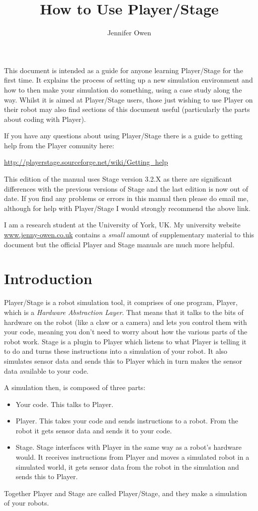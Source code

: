\documentclass[a4paper]{report}
\title{How to Use Player/Stage}
\author{Jennifer Owen}
\newcommand{\plst}{Player/Stage\xspace}
\newcommand{\pl}{Player\xspace}
\begin{document}
\maketitle

This document is intended as a guide for anyone learning \plst for the first time. It explains the process of setting up a new simulation environment and how to then make your simulation do something, using a case study along the way. Whilst it is aimed at \plst users, those just wishing to use \pl on their robot may also find sections of this document useful (particularly the parts about coding with Player).

If you have any questions about using \plst there is a guide to getting help from the \pl comunity here:
\begin{center}
	\url{http://playerstage.sourceforge.net/wiki/Getting_help}
\end{center}
This edition of the manual uses Stage version 3.2.X as there are significant differences with the previous versions of Stage and the last edition is now out of date. If you find any problems or errors in this manual then please do email me, although for help with Player/Stage I would strongly recommend the above link. 

I am a research student at the University of York, UK. My university website \url{www.jenny-owen.co.uk} contains a \textit{small} amount of supplementary material to this document but the official Player and Stage manuals are much more helpful.

\newpage
\tableofcontents

\newpage
\section{Introduction}
\plst is a robot simulation tool, it comprises of one program, \pl, which is a \emph{Hardware Abstraction Layer}. That means that it talks to the bits of hardware on the robot (like a claw or a camera) and lets you control them with your code, meaning you don't need to worry about how the various parts of the robot work. Stage is a plugin to \pl which listens to what \pl is telling it to do and turns these instructions into a simulation of your robot. It also simulates sensor data and sends this to \pl which in turn makes the sensor data available to your code.

A simulation then, is composed of three parts:
\begin{itemize}
\item Your code. This talks to \pl.
\item \pl. This takes your code and sends instructions to a robot. From the robot it gets sensor data and sends it to your code.
\item Stage. Stage interfaces with \pl in the same way as a robot's hardware would. It receives instructions from \pl and moves a simulated robot in a simulated world, it gets sensor data from the robot in the simulation and sends this to \pl.
\end{itemize}
Together \pl and Stage are called \plst, and they make a simulation of your robots.
\end{document}

